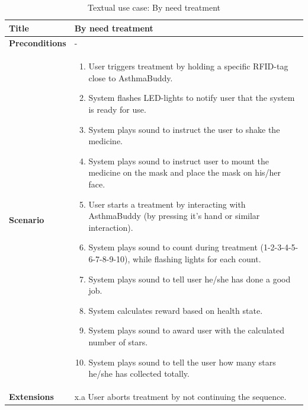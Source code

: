 \begin{table}[H]
\centering
\begin{tabular}{|p{4.0cm} | p{9.0cm} |}
\hline
\textbf{Title} & By need treatment \\
\hline
\textbf{Preconditions} & - \\
\hline 
\textbf{Scenario} & 
	\begin{enumerate}
	  \itemsep0em
	  \item User triggers treatment by holding a specific RFID-tag close to AsthmaBuddy.
	  \item System flashes LED-lights to notify user that the system is ready for use.
	  \item System plays sound to instruct the user to shake the medicine.
	  \item System plays sound to instruct user to mount the medicine on the mask and place the mask on his/her face.
	  \item User starts a treatment by interacting with AsthmaBuddy (by pressing it's hand or similar interaction).
	  \item System plays sound to count during treatment (1-2-3-4-5-6-7-8-9-10), while flashing lights for each count.
	  \item System plays sound to tell user he/she has done a good job.
	  \item System calculates reward based on health state.
	  \item System plays sound to award user with the calculated number of stars.
	  \item System plays sound to tell the user how many stars he/she has collected totally.
	\end{enumerate}
\\
\hline
	\textbf{Extensions} & 
		x.a User aborts treatment by not continuing the sequence.
\\
\hline
\end{tabular}
\caption{Textual use case: By need treatment}
\label{tab:textual-use-case}
\end{table}



